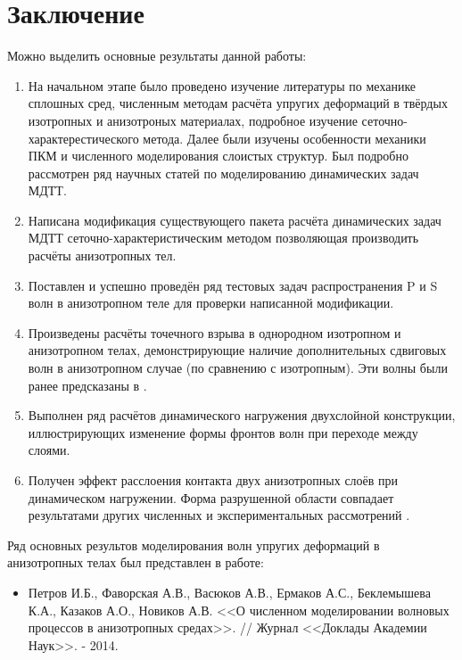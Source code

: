 \section*{Заключение}
\setcounter{subsection}{0}

	Можно выделить основные результаты данной работы:	
\begin{enumerate}
	\item На начальном этапе было проведено изучение литературы по механике сплошных сред, численным методам расчёта упругих деформаций в твёрдых изотропных и анизотроных материалах, подробное изучение сеточно-характерестического метода.
			Далее были изучены особенности механики ПКМ и численного моделирования слоистых структур. Был подробно рассмотрен ряд научных статей по моделированию динамических задач МДТТ.
	\item Написана модификация существующего пакета расчёта динамических задач МДТТ сеточно-характеристическим методом позволяющая производить расчёты анизотропных тел.
	\item Поставлен и успешно проведён ряд тестовых задач распространения P и S волн в анизотропном теле для проверки написанной модификации.
	\item Произведены расчёты точечного взрыва в однородном изотропном и анизотропном телах, демонстрирующие наличие дополнительных сдвиговых волн в анизотропном случае (по сравнению с изотропным). Эти волны были ранее предсказаны в \cite{ogurtsov}.
	\item Выполнен ряд расчётов динамического нагружения двухслойной конструкции, иллюстрирующих изменение формы фронтов волн при переходе между слоями.
	\item Получен эффект расслоения контакта двух анизотропных слоёв при динамическом нагружении. Форма разрушенной области совпадает результатами других численных и экспериментальных рассмотрений \cite{serge}.
\end{enumerate}

	Ряд основных результов моделирования волн упругих деформаций в анизотропных телах был представлен в работе:
	\begin{itemize}
		\item Петров И.Б., Фаворская А.В., Васюков А.В., Ермаков А.С., Беклемышева К.А., Казаков А.О., Новиков А.В. <<О численном моделировании волновых процессов в анизотропных средах>>. // Журнал <<Доклады Академии Наук>>. - 2014.
	\end{itemize}
